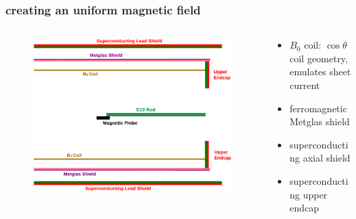 \documentclass{beamer}
\begin{document}
\begin{frame}
\frametitle{creating an uniform magnetic field}

    \begin{columns}
    
    \begin{column}{0.5\textwidth}
    \begin{figure}
    \includegraphics[width=\textwidth, angle=90, trim=70px 70px 70px 70px]
    {figures/simplified_structure.eps}
    \end{figure}
    \end{column}

    \pause

    \begin{column}{0.5\textwidth}
    \begin{itemize}
        \item $B_0$ coil: $\cos\theta$ coil geometry, emulates sheet current \pause
        \item ferromagnetic Metglas shield \pause
        \item superconducting axial shield \pause
        \item superconducting upper endcap
    \end{itemize}
    \end{column}

    \end{columns}

\end{frame}

%
%
\end{document}
